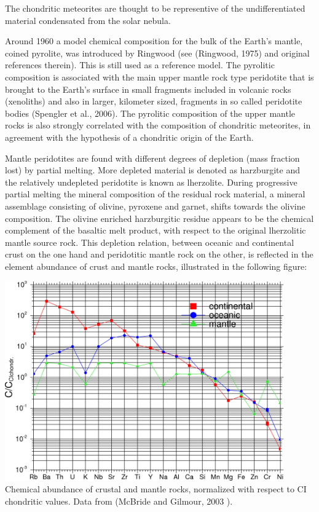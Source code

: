 The chondritic meteorites are thought to be representive
of the undifferentiated material condensated from the solar nebula.

Around 1960 a model chemical composition for the bulk of the Earth's
mantle, coined pyrolite,
was introduced by Ringwood (see (Ringwood, 1975) and original references
therein).
This is still used as a reference model.
The pyrolitic composition is associated with the main upper mantle rock type
peridotite that is brought to the Earth's surface in small fragments
included in volcanic rocks (xenoliths) and also in larger,
kilometer sized, fragments in so called peridotite bodies
(Spengler et al., 2006).
The pyrolitic composition of the upper mantle rocks is also strongly
correlated with the composition of chondritic meteorites,
in agreement with the hypothesis of a chondritic origin of the Earth.

Mantle peridotites are found with different degrees of depletion 
(mass fraction lost) by partial melting.
More depleted material is denoted as harzburgite and the relatively 
undepleted peridotite is known as lherzolite.
During progressive partial melting the mineral composition of the residual
rock material, a mineral assemblage consisting of olivine, pyroxene and
garnet, shifts towards the olivine composition.
The olivine enriched harzburgitic residue appears to be the chemical
complement of the basaltic melt product, with respect to the original
lherzolitic mantle source rock.
This depletion relation, between oceanic and continental crust on the one
hand and peridotitic mantle rock on the other,
is reflected in the element abundance of crust and mantle rocks, 
illustrated in the following figure:

\begin{center}
\includegraphics[width=12cm]{images/gravity/abund}\\
{\captionfont 
Chemical abundance of crustal and mantle rocks,
normalized with respect to CI chondritic values.
Data from (McBride and Gilmour, 2003 \cite{mcgi03}).
}
\end{center}


